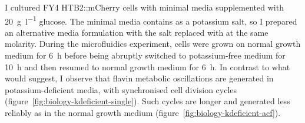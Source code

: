 I cultured FY4 HTB2::mCherry cells with minimal media supplemented with \SI{20}{\gram~\litre^{-1}} glucose.
The minimal media contains  as a potassium salt, so I prepared an alternative media formulation with the salt replaced with  at the same molarity.
During the microfluidics experiment, cells were grown on normal growth medium for \SI{6}{\hour} before being abruptly switched to potassium-free medium for \SI{10}{\hour} and then resumed to normal growth medium for \SI{6}{\hour}.
In contrast to what \textcite{oneillEukaryoticCellBiology2020} would suggest, I observe that flavin metabolic oscillations are generated in potassium-deficient media, with synchronised cell division cycles (figure~\ref{fig:biology-kdeficient-single}).
Such cycles are longer and generated less reliably as in the normal growth medium (figure~\ref{fig:biology-kdeficient-acf}).


